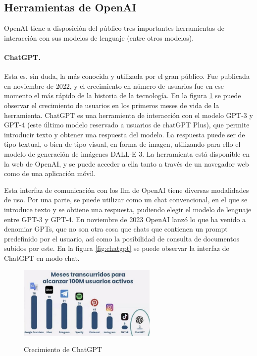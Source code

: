 \subsection{Herramientas de OpenAI}

OpenAI tiene a disposición del público tres importantes herramientas de interacción con sus modelos de lenguaje (entre otros modelos). 

    \paragraph{ChatGPT.} Esta es, sin duda, la más conocida y utilizada por el gran público. Fue publicada en noviembre de 2022, y el crecimiento en número de usuarios fue en ese momento el más rápido de la historia de la tecnología. En la figura \ref{fig:crecimiento_chatgpt} se puede observar el crecimiento de usuarios en los primeros meses de vida de la herramienta. ChatGPT es una herramienta de interacción con el modelo GPT-3 y GPT-4 (este último modelo reservado a usuarios de chatGPT Plus), que permite introducir texto y obtener una respuesta del modelo. La respuesta puede ser de tipo textual, o bien de tipo visual, en forma de imagen, utilizando para ello el modelo de generación de imágenes DALL-E 3. La herramienta está disponible en la web de OpenAI, y se puede acceder a ella tanto a través de un navegador web como de una aplicación móvil.

    Esta interfaz de comunicación con los \gls{llm} de OpenAI tiene diversas modalidades de uso. Por una parte, se puede utilizar como un chat convencional, en el que se introduce texto y se obtiene una respuesta, pudiendo elegir el modelo de lenguaje entre GPT-3 y GPT-4. En noviembre de 2023 OpenAI lanzó lo que ha venido a denomiar GPTs, que no son otra cosa que chats que contienen un prompt predefinido por el usuario, así como la posibilidad de consulta de documentos subidos por este. En la figura \ref{fig:chatgpt} se puede observar la interfaz de ChatGPT en modo chat.

    \begin{figure}[h]
        \caption[Crecimiento de ChatGPT]{Crecimiento de ChatGPT}
        \centering
        \includegraphics[width=0.6\textwidth]{./figuras/100millonesUsuariosChatgpt.jpeg}
        \label{fig:crecimiento_chatgpt}
    \end{figure}

